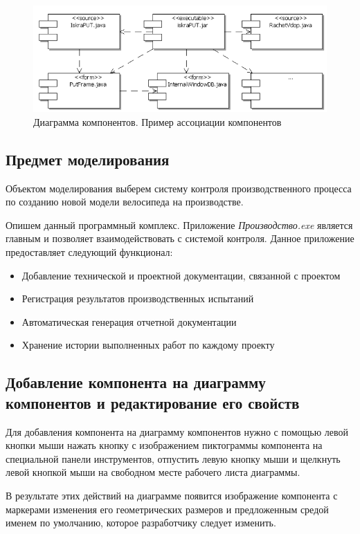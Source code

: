 \documentclass[a4paper,12pt]{extreport}
\begin{document}
\begin{figure}
	\centering
	\includegraphics[width=0.6\linewidth]{images/componentsassociation}
	\caption{Диаграмма компонентов. Пример ассоциации компонентов}
	\label{fig:componentsassociation}
\end{figure}

\subsection*{Предмет моделирования}
Объектом моделирования выберем систему контроля производственного процесса по созданию новой модели велосипеда на производстве. 

Опишем данный программный комплекс. Приложение \textit{Производство.exe} является главным и позволяет взаимодействовать с системой контроля. Данное приложение предоставляет следующий функционал:
\begin{itemize}
	\item Добавление технической и проектной документации, связанной с проектом
	\item Регистрация результатов производственных испытаний
	\item Автоматическая генерация отчетной документации
	\item Хранение истории выполненных работ по каждому проекту
\end{itemize}

\subsection*{Добавление компонента на диаграмму компонентов и редактирование его свойств}
Для добавления компонента на диаграмму компонентов нужно с помощью левой кнопки мыши нажать кнопку с изображением пиктограммы компонента на специальной панели инструментов, отпустить левую кнопку мыши и щелкнуть левой кнопкой мыши на свободном месте рабочего листа диаграммы. 

В результате этих действий на диаграмме появится изображение компонента с маркерами изменения его геометрических размеров и предложенным средой именем по умолчанию, которое разработчику следует изменить. 
\end{document}
